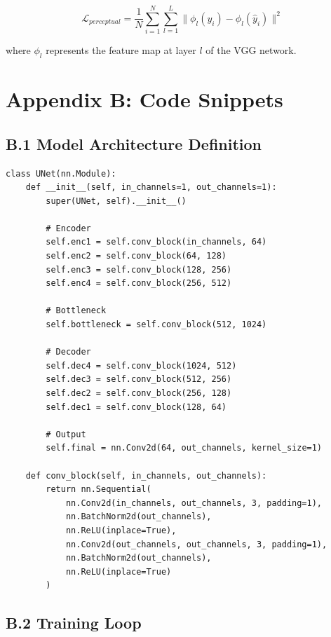 \documentclass[12pt,a4paper]{report}
\begin{document}
\begin{equation}
\mathcal{L}_{perceptual} = \frac{1}{N}\sum_{i=1}^{N}\sum_{l=1}^{L}\| \phi_l(y_i) - \phi_l(\hat{y}_i) \|^2
\end{equation}

where $\phi_l$ represents the feature map at layer $l$ of the VGG network.

\section*{Appendix B: Code Snippets}

\subsection*{B.1 Model Architecture Definition}

\begin{verbatim}
class UNet(nn.Module):
    def __init__(self, in_channels=1, out_channels=1):
        super(UNet, self).__init__()

        # Encoder
        self.enc1 = self.conv_block(in_channels, 64)
        self.enc2 = self.conv_block(64, 128)
        self.enc3 = self.conv_block(128, 256)
        self.enc4 = self.conv_block(256, 512)

        # Bottleneck
        self.bottleneck = self.conv_block(512, 1024)

        # Decoder
        self.dec4 = self.conv_block(1024, 512)
        self.dec3 = self.conv_block(512, 256)
        self.dec2 = self.conv_block(256, 128)
        self.dec1 = self.conv_block(128, 64)

        # Output
        self.final = nn.Conv2d(64, out_channels, kernel_size=1)

    def conv_block(self, in_channels, out_channels):
        return nn.Sequential(
            nn.Conv2d(in_channels, out_channels, 3, padding=1),
            nn.BatchNorm2d(out_channels),
            nn.ReLU(inplace=True),
            nn.Conv2d(out_channels, out_channels, 3, padding=1),
            nn.BatchNorm2d(out_channels),
            nn.ReLU(inplace=True)
        )
\end{verbatim}

\subsection*{B.2 Training Loop}
\end{document}
